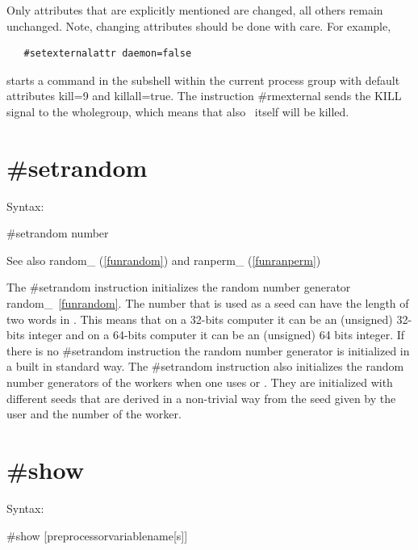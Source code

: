 Only attributes that are explicitly mentioned are changed, all others remain 
unchanged. Note, changing attributes should be done with care. For example,
\begin{verbatim}
   #setexternalattr daemon=false
\end{verbatim}
starts a command in the subshell within the current process group with
default attributes kill=9 and killall=true.
The instruction \#rmexternal sends the
KILL signal to the wholegroup, which means that also 
\FORM\ itself will be killed.


\section{\#setrandom}
\label{presetrandom}

\noindent Syntax:

\#setrandom number
 
\noindent See also random\_ (\ref{funrandom}) and ranperm\_ (\ref{funranperm})

\noindent The \#setrandom instruction initializes the 
random number generator 
random\_~\ref{funrandom}. The 
number that is used as a seed can have the length of two words in \FORM\@. 
This means that on a 32-bits computer it can be an (unsigned) 32-bits 
integer and on a 64-bits computer it can be an (unsigned) 64 bits integer. 
If there is no \#setrandom instruction the random number generator is 
initialized in a built in standard way. The \#setrandom instruction also 
initializes the random number generators of the workers when one uses \TFORM{} 
or \ParFORM\@. They are initialized with different seeds that are derived in a 
non-trivial way from the seed given by the user and the number of the 
worker.


\section{\#show}
\label{preshow}

\noindent Syntax:

\#show [preprocessorvariablename[s]]

